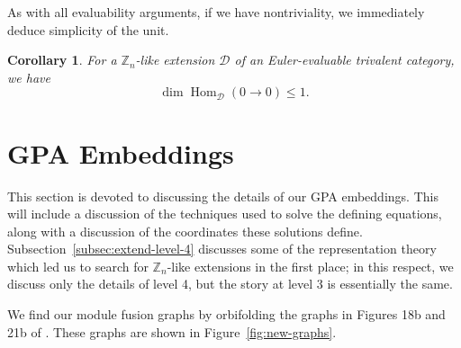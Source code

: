 \documentclass[pdflatex,sn-mathphys-num]{sn-jnl}%
\theoremstyle{thmstyleone}%
\newtheorem{corollary}{Corollary}
\theoremstyle{thmstyletwo}%
\theoremstyle{thmstylethree}%
\newcommand{\Z}{\mathbb{Z}}
\newcommand{\DD}{\mathcal{D}}
\DeclareMathOperator{\Hom}{Hom}
\begin{document}
As with all evaluability arguments, if we have nontriviality, we immediately deduce simplicity of the unit.

\begin{corollary}\label{cor:Zn-simple-unit}
    For a $\Z_n$-like extension $\DD$ of an Euler-evaluable trivalent category, we have
    \[
        \dim\Hom_{\DD} (0\to 0) \leq 1.
    \]
\end{corollary}







\section{GPA Embeddings}\label{sec:gpa-emb}

This section is devoted to discussing the details of our GPA embeddings.
This will include a discussion of the techniques used to solve the defining equations,
along with a discussion of the coordinates these solutions define.
Subsection~\ref{subsec:extend-level-4} discusses some of the representation theory which led us to 
search for $\Z_n$-like extensions in the first place;
in this respect, we discuss only the details of level 4, but the story at level 3 is essentially the same.

We find our module fusion graphs by orbifolding the graphs in Figures 18b and 21b of \cite{g2_graphs}.
These graphs are shown in Figure~\ref{fig:new-graphs}.
\end{document}
